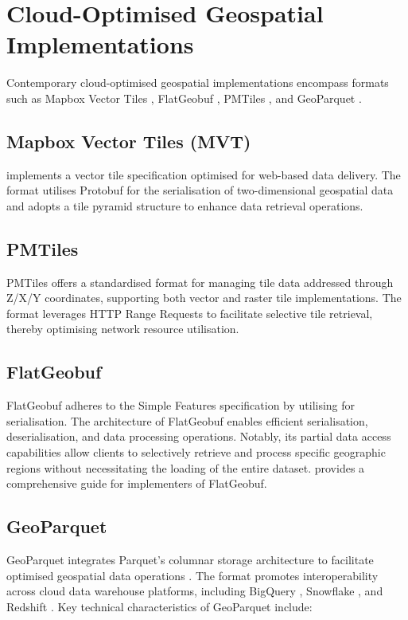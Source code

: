 \section{Cloud-Optimised Geospatial Implementations}
\label{rw:cloud_optimised_implementations}
Contemporary cloud-optimised geospatial implementations encompass formats such as Mapbox Vector Tiles \citep{mapbox-vector-tiles}, FlatGeobuf \citep{flatgeobuf}, PMTiles \citep{pmtiles}, and GeoParquet \citep{geoparquet}.

\subsection{Mapbox Vector Tiles (MVT)}
\label{rw:cloud_optimised_implementations:mvt}
\citet{mapbox-vector-tiles} implements a vector tile specification optimised for web-based data delivery. The format utilises Protobuf for the serialisation of two-dimensional geospatial data and adopts a tile pyramid structure to enhance data retrieval operations.

\subsection{PMTiles}
\label{rw:cloud_optimised_implementations:pmtiles}
PMTiles offers a standardised format for managing tile data addressed through Z/X/Y coordinates, supporting both vector and raster tile implementations. The format leverages HTTP Range Requests \citep{http_range_requests} to facilitate selective tile retrieval, thereby optimising network resource utilisation.

\subsection{FlatGeobuf}
\label{rw:cloud_optimised_implementations:flatgeobuf}
FlatGeobuf adheres to the Simple Features \citet{simple_features} specification by utilising \citet{flatbuffers} for serialisation. The architecture of FlatGeobuf enables efficient serialisation, deserialisation, and data processing operations. Notably, its partial data access capabilities allow clients to selectively retrieve and process specific geographic regions without necessitating the loading of the entire dataset. \citet{horance_2022_detail} provides a comprehensive guide for implementers of FlatGeobuf.

\subsection{GeoParquet}
\label{rw:cloud_optimised_implementations:geoparquet}
GeoParquet integrates Parquet's columnar storage architecture to facilitate optimised geospatial data operations \citep{geoparquet}. The format promotes interoperability across cloud data warehouse platforms, including BigQuery \citep{bigquery}, Snowflake \citep{snowflake}, and Redshift \citep{redshift}. Key technical characteristics of GeoParquet include:

